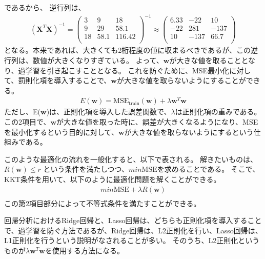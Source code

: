 \documentclass{ltjsarticle}
\begin{document}
であるから、
逆行列は、
\begin{align}
  (\boldsymbol{X}^T\boldsymbol{X})^{-1} = 
  \begin{pmatrix}
    3 & 9 & 18\\
    9 & 29 & 58.1\\
    18 & 58.1 & 116.42\\ 
  \end{pmatrix}^{-1}
  \approx
  \begin{pmatrix}
    6.33 & -22 & 10\\
    -22 & 281 & -137\\
    10 & -137 & 66.7\\
  \end{pmatrix}
\end{align}
となる。本来であれば、大きくても2桁程度の値に収まるべきであるが、この逆行列は、数値が大きくなりすぎている。
よって、$\boldsymbol{w}$が大きな値を取ることとなり、過学習を引き起こすこととなる。
これを防ぐために、MSE最小化に対して、罰則化項を導入することで、$\boldsymbol{w}$が大きな値を取らないようにすることができる。
\begin{align}
  E(\boldsymbol{w}) = \text{MSE}_{\text{train}}(\boldsymbol{w}) + \lambda \boldsymbol{w}^T\boldsymbol{w}
\end{align}
ただし、E($\boldsymbol{w}$)は、正則化項を導入した誤差関数で、$\lambda$は正則化項の重みである。この2項目で、$\boldsymbol{w}$が大きな値を取った時に、誤差が大きくなるようになり、MSEを最小化するという目的に対して、$\boldsymbol{w}$が大きな値を取らないようにするという仕組みである。

このような最適化の流れを一般化すると、以下で表される。
解きたいものは、$R(\boldsymbol{w}) \le r$ という条件を満たしつつ、$min \text{MSE}$を求めることである。
そこで、KKT条件を用いて、以下のように最適化問題を解くことができる。
\begin{align}
  min \text{MSE}  + \lambda R(\boldsymbol{w})\\
\end{align}
この第2項目部分によって不等式条件を満たすことができる。

回帰分析におけるRidge回帰と、Lasso回帰は、どちらも正則化項を導入することで、過学習を防ぐ方法であるが、Ridge回帰は、L2正則化を行い、Lasso回帰は、L1正則化を行うという説明がなされることが多い。
そのうち、L2正則化というものが$\lambda \boldsymbol{w}^T\boldsymbol{w}$を使用する方法になる。
\end{document}
